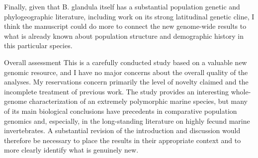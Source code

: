
\begin{point}{} %
Finally, given that B. glandula itself has a substantial population
genetic and phylogeographic literature, including work on its strong
latitudinal genetic cline, I think the manuscript could do more to
connect the new genome-wide results to what is already known about
population structure and demographic history in this particular species.
\end{point}


\begin{point}{Overall assessment}
This is a carefully conducted study based on a valuable new genomic
resource, and I have no major concerns about the overall quality of the
analyses. My reservations concern primarily the level of novelty claimed
and the incomplete treatment of previous work. The study provides an
interesting whole-genome characterization of an extremely polymorphic
marine species, but many of its main biological conclusions have
precedents in comparative population genomics and, especially, in the
long-standing literature on highly fecund marine invertebrates. A
substantial revision of the introduction and discussion would therefore
be necessary to place the results in their appropriate context and to
more clearly identify what is genuinely new.
\end{point}

